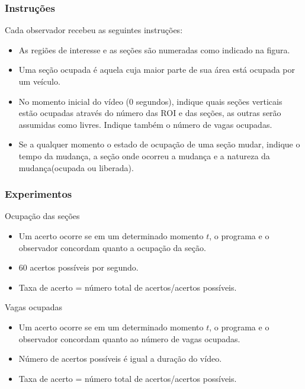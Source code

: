 \documentclass{beamer}
\begin{document}
\begin{frame}
\frametitle{Instruções}
Cada observador recebeu as seguintes instruções:
\begin{itemize}
  \item As regiões de interesse e as seções são numeradas como indicado na figura.
	\item Uma seção ocupada é aquela cuja maior parte de sua área está ocupada por um veículo.
	\item No momento inicial do vídeo ($0$ segundos), indique quais seções verticais estão ocupadas através do número das ROI e das seções, as outras serão assumidas como livres. Indique também o número de vagas ocupadas.
	\item Se a qualquer momento o estado de ocupação de uma seção mudar, indique o tempo da mudança, a seção onde ocorreu a mudança e a natureza da mudança(ocupada ou liberada).
\end{itemize}
\end{frame}

\begin{frame}
\frametitle{Experimentos}
\begin{block}{Ocupação das seções}
\begin{itemize}
\item Um acerto ocorre se em um determinado momento $t$, o programa e o observador concordam quanto a ocupação da seção.
\item $60$ acertos possíveis por segundo.
\item Taxa de acerto = número total de acertos/acertos possíveis.
\end{itemize}
\end{block}

\begin{block}{Vagas ocupadas}
\begin{itemize}
\item Um acerto ocorre se em um determinado momento $t$, o programa e o observador concordam quanto ao número de vagas ocupadas.
\item Número de acertos possíveis é igual a duração do vídeo.
\item Taxa de acerto = número total de acertos/acertos possíveis.
\end{itemize}
\end{block}
\end{frame}
\end{document}
